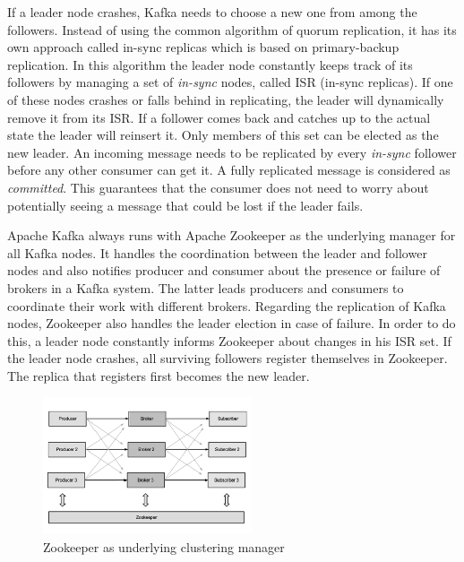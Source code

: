 If a leader node crashes, Kafka needs to choose a new one from among the
followers. Instead of using the common algorithm of quorum replication, it
has its own approach called in-sync replicas which is based on primary-backup
replication. In this algorithm the leader node
constantly keeps track of its followers by managing a set of \textit{in-sync}
nodes, called ISR (in-sync replicas). If one of these nodes crashes or falls
behind in replicating, the leader will dynamically remove it from its ISR. If a
follower comes back and catches up to the actual state the leader will reinsert
it. Only members of this set can be elected as the new leader. An incoming
message needs to be replicated by every \textit{in-sync} follower before any
other consumer can get it. A fully replicated message is considered as
\textit{committed}. This guarantees that the consumer does not need to worry
about potentially seeing a message that could be lost if the leader fails.
\cite{apachekafka}
\cite{kafka-wiki-replication}

Apache Kafka always runs with Apache Zookeeper as the underlying manager for all
Kafka nodes. It handles the coordination between the leader and follower nodes
and also notifies producer and consumer about the presence or failure of brokers in a
Kafka system. The latter leads producers and consumers to coordinate their work
with different brokers. Regarding the replication of Kafka nodes, Zookeeper
also handles the leader election in case of failure. In order to do this, a leader node
constantly informs Zookeeper about changes in his ISR set. If the leader node
crashes, all surviving followers register themselves in Zookeeper. The replica that
registers first becomes the new leader. \cite{kafka-wiki-replication}
\cite{ArtKafkaInfoQ} \cite{apacheZookeeper}

\begin{figure}[H]
    \centering
    \includegraphics[width=0.55\textwidth]{images/kafka-replication-zookeeper.png}
    \caption{Zookeeper as underlying clustering manager \cite{ArtKafkaInfoQ}}
    \label{fig:the-log}
\end{figure}


